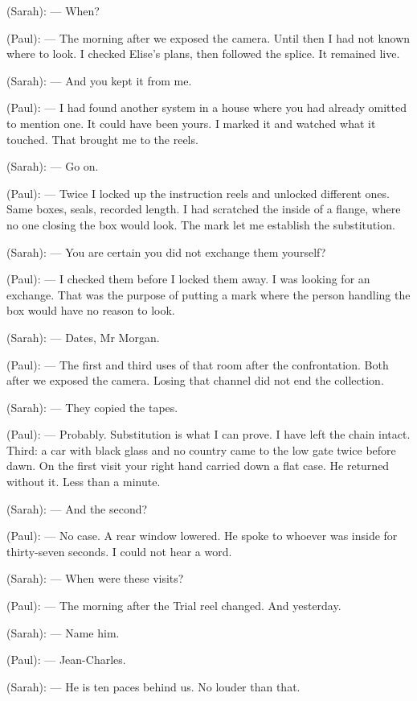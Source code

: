 \begin{room}
(Sarah): --- When?

(Paul): --- The morning after we exposed the camera. Until then I had not known where to look. I checked Elise's plans, then followed the splice. It remained live.

(Sarah): --- And you kept it from me.

(Paul): --- I had found another system in a house where you had already omitted to mention one. It could have been yours. I marked it and watched what it touched. That brought me to the reels.

(Sarah): --- Go on.

(Paul): --- Twice I locked up the instruction reels and unlocked different ones. Same boxes, seals, recorded length. I had scratched the inside of a flange, where no one closing the box would look. The mark let me establish the substitution.

(Sarah): --- You are certain you did not exchange them yourself?

(Paul): --- I checked them before I locked them away. I was looking for an exchange. That was the purpose of putting a mark where the person handling the box would have no reason to look.

(Sarah): --- Dates, Mr Morgan.

(Paul): --- The first and third uses of that room after the confrontation. Both after we exposed the camera. Losing that channel did not end the collection.

(Sarah): --- They copied the tapes.

(Paul): --- Probably. Substitution is what I can prove. I have left the chain intact. Third: a car with black glass and no country came to the low gate twice before dawn. On the first visit your right hand carried down a flat case. He returned without it. Less than a minute.

(Sarah): --- And the second?

(Paul): --- No case. A rear window lowered. He spoke to whoever was inside for thirty-seven seconds. I could not hear a word.

(Sarah): --- When were these visits?

(Paul): --- The morning after the Trial reel changed. And yesterday.

(Sarah): --- Name him.

(Paul): --- Jean-Charles.

\centerline{}

(Sarah): --- He is ten paces behind us. No louder than that.


\end{room}
